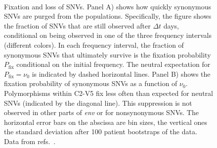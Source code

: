 \documentclass[11pt]{article}
\newcommand{\pfix}{P_{\mathrm{fix}}}
\newcommand{\env}{\textit{env}}
\newcommand{\shankaregion}{C2-V5}
\begin{document}
\begin{figure}
\begin{center}
\\
\caption{Fixation and loss of SNVs.
Panel A) shows how quickly synonymous SNVs are purged from the populations. 
Specifically, the figure shows the fraction of SNVs that are still observed
after $\Delta t$ days, conditional on being observed in one of the three frequency 
intervals (different colors). 
In each frequency interval, the fraction of synonymous
SNVs that ultimately survive is the fixation probability $\pfix$ conditional on the
initial frequency. The neutral expectation for $\pfix=\nu_0$ is indicated by 
dashed horizontal lines.
Panel B) shows the fixation probability of synonymous SNVs as a function of $\nu_0$. Polymorphisms within \shankaregion{} fix less
often than expected for neutral SNVs (indicated by the diagonal line).
This suppression is not observed in other parts of \env{} or for nonsynonymous
SNVs.
The horizontal error bars on the abscissa are bin sizes, the vertical ones the
standard deviation after 100 patient bootstraps of the data. Data from
refs.~\cite{shankarappa_consistent_1999,liu_selection_2006, bunnik_autologous_2008}.}
\label{fig:fixp}
\end{center}
\end{figure}
\end{document}
